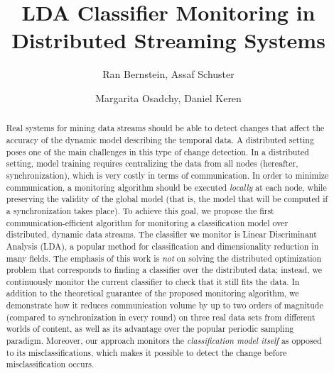 \documentclass[sigconf]{acmart}
\begin{document}
\title{LDA Classifier Monitoring in Distributed Streaming Systems} 
\author{Ran Bernstein, Assaf Schuster}
  
\author{Margarita Osadchy, Daniel Keren}

\begin{abstract}
Real systems for mining data streams should be able to detect changes that affect the accuracy of the dynamic model describing the temporal data. A distributed setting poses one of the main challenges in this type of change detection. In a distributed setting, model training requires centralizing the data from all nodes (hereafter, synchronization), which is very costly in terms of communication. In order to minimize communication, a monitoring algorithm should be executed \emph{locally} at each node,
while preserving the validity of the global model (that is, the model that will be computed if a synchronization takes place). To achieve this goal, we propose the first communication-efficient algorithm for monitoring a classification model over distributed, dynamic data streams. The classifier we monitor is Linear Discriminant Analysis (LDA), a popular method for classification and dimensionality reduction in many fields.  The emphasis of this work is \emph{not} on solving the distributed optimization problem
that corresponds to finding a classifier over the distributed data; instead, we continuously
monitor the current classifier to check that it still fits the data. In addition to the theoretical guarantee of the proposed monitoring algorithm, we demonstrate how it reduces communication volume by up to two orders of magnitude (compared to synchronization in every round) on three real data sets from different worlds of content, as well as its advantage over the
popular periodic sampling paradigm. Moreover, our approach monitors the \emph{classification model itself} as opposed to its misclassifications, which makes it possible to detect the change before misclassification occurs.
\end{abstract}
\end{document}
